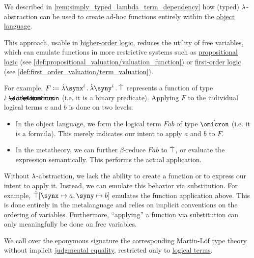 \begin{remark}\label{rem:paramters_in_hol}
  We described in \cref{rem:simply_typed_lambda_term_dependency} how (typed) \( {\mathrm \lambda} \)-abstraction can be used to create ad-hoc functions entirely within the \hyperref[con:metalogic]{object language}.

  This approach, usable in \hyperref[def:higher_order_logic]{higher-order logic}, reduces the utility of free variables, which can emulate functions in more restrictive systems such as \hyperref[def:propositional_logic]{propositional logic} (see \cref{def:propositional_valuation/valuation_function}) or \hyperref[def:first_order_logic]{first-order logic} (see \cref{def:first_order_valuation/term_valuation}).

  For example, \( F \coloneqq \qabs {\synx^{\syn\iota}} \qabs {\syny^{\syn\iota}} \syntop \) represents a function of type \( \syn\iota \synimplies \syn\iota \synimplies \syn\omicron \) (i.e. it is a binary predicate). Applying \( F \) to the individual logical terms \( a \) and \( b \) is done on two levels:
  \begin{itemize}
    \item In the object language, we form the logical term \( Fab \) of type \( \syn\omicron \) (i.e. it is a formula). This merely indicates our intent to apply \( a \) and \( b \) to \( F \).

    \item In the metatheory, we can further \( \beta \)-reduce \( Fab \) to \( \dot{\top} \), or evaluate the expression semantically. This performs the actual application.
  \end{itemize}

  Without \( {\mathrm \lambda} \)-abstraction, we lack the ability to create a function or to express our intent to apply it. Instead, we can emulate this behavior via substitution. For example, \( \syntop[\synx \mapsto a, \syny \mapsto b] \) emulates the function application above. This is done entirely in the metalanguage and relies on implicit conventions on the ordering of variables. Furthermore, \enquote{applying} a function via substitution can only meaningfully be done on free variables.
\end{remark}

\begin{definition}\label{def:higher_order_logic}
  We call  over the \hyperref[def:hol_signature]{eponymous signature} the corresponding \hyperref[def:martin_lof_type_theory]{Martin-L\"of type theory} without implicit \hyperref[con:equality]{judgmental equality}, restricted only to \hyperref[def:hol_term]{logical terms}.
\end{definition}

